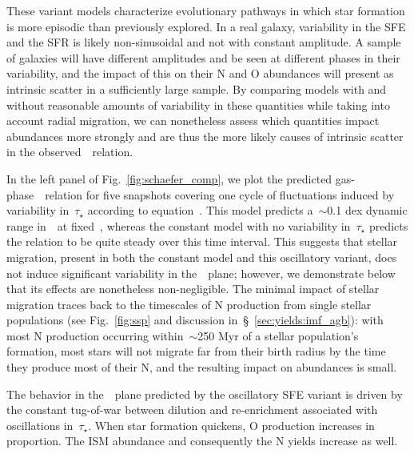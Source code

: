 \documentclass[ms.tex]{subfiles}
\begin{document}
These variant models characterize evolutionary pathways in which star formation
is more episodic than previously explored.
In a real galaxy, variability in the SFE and the SFR is likely non-sinusoidal
and not with constant amplitude.
A sample of galaxies will have different amplitudes and be seen at different
phases in their variability, and the impact of this on their N and O abundances
will present as intrinsic scatter in a sufficiently large sample.
By comparing models with and without reasonable amounts of variability in these
quantities while taking into account radial migration, we can nonetheless
assess which quantities impact abundances more strongly and are thus the more
likely causes of intrinsic scatter in the observed~\ohno~relation.
\par
In the left panel of Fig.~\ref{fig:schaefer_comp}, we plot the predicted
gas-phase~\ohno~relation for five snapshots covering one cycle of fluctuations
induced by variability in~$\tau_\star$ according to equation~.
This model predicts a~$\sim$0.1 dex dynamic range in~\no~at fixed~\oh, whereas
the constant model with no variability in~$\tau_\star$ predicts the relation
to be quite steady over this time interval.
This suggests that stellar migration, present in both the constant model and
this oscillatory variant, does not induce significant variability in
the~\ohno~plane; however, we demonstrate below that its effects are nonetheless
non-negligible.
The minimal impact of stellar migration traces back to the timescales of N
production from single stellar populations (see Fig.~\ref{fig:ssp} and
discussion in~\S~\ref{sec:yields:imf_agb}): with most N production occurring
within~$\sim$250 Myr of a stellar population's formation, most stars will not
migrate far from their birth radius by the time they produce most of their N,
and the resulting impact on abundances is small.
\par
The behavior in the~\ohno~plane predicted by the oscillatory SFE variant
is driven by the constant tug-of-war between dilution and re-enrichment
associated with oscillations in~$\tau_\star$.
When star formation quickens, O production increases in proportion.
The ISM abundance and consequently the N yields increase as well.
\end{document}
